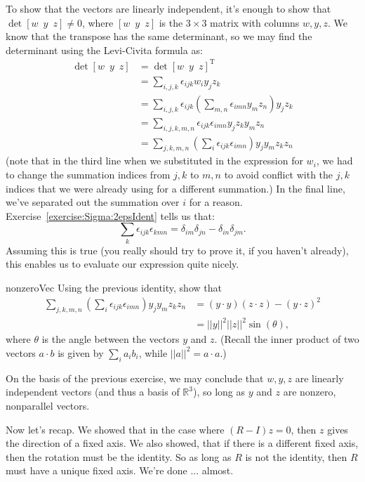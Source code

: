 \begin{itemize}
To show that the vectors are linearly independent, it's enough to show that $\det [w \,\,\, y\,\,\, z] \neq 0$, where $[w \,\,\, y\,\,\, z]$ is the $3 \times 3$ matrix with columns $w, y,z$. We know that the transpose has the same determinant, so we may find the determinant using the Levi-Civita formula as:
\begin{align*}
\det [w \,\,\, y\,\,\, z] &= \det [w \,\,\, y\,\,\, z]^{\text{T}}\\
&= \sum_{i,j,k} \epsilon_{ijk} w_i y_j z_k \\
&= \sum_{i,j,k} \epsilon_{ijk} \left( \sum_{m,n}\epsilon_{imn}y_mz_n \right) y_j z_k \\
&= \sum_{i,j,k,m,n} \epsilon_{ijk} \epsilon_{imn}  y_j z_ky_mz_n \\
&=  \sum_{j,k,m,n} \left( \sum_{i} \epsilon_{ijk} \epsilon_{imn}\right)  y_j y_m z_k z_n
\end{align*}
(note that in the third line when we substituted in the expression for $w_i$, we had to change the summation indices from $j,k$ to $m,n$ to avoid conflict with the $j,k$ indices that we were already using for a different summation.) In the final line, we've separated out the summation over $i$ for a reason.  Exercise~\ref{exercise:Sigma:2epsIdent} tells us that:
\[\sum_k \epsilon_{ijk} \epsilon_{kmn} = \delta_{im} \delta_{jn} - \delta_{in} \delta_{jm}. \]
Assuming this is true (you really should try to prove it, if you haven't already), this enables us to evaluate our expression quite nicely.

\begin{exercise}{nonzeroVec}
Using the previous identity, show that 
\begin{align*}
 \sum_{j,k,m,n} \left( \sum_{i} \epsilon_{ijk} \epsilon_{imn}\right)  y_j y_m z_k z_n &= (y \cdot y)(z \cdot z)-(y \cdot z)^2 \\
&= ||y||^2 ||z||^2 \sin(\theta),
\end{align*}
where $\theta$ is the angle between the vectors $y$ and $z$.
(Recall the inner product of two vectors $a \cdot b$ is given by $\sum_i a_i b_i$, while $||a||^2 = a \cdot a$.)
\end{exercise}
On the basis of the previous exercise, we may conclude that $w,y,z$ are linearly independent vectors (and thus a basis of $\mathbb{R}^3$), so long as $y$ and $z$ are nonzero, nonparallel vectors. 

Now let's recap.  We showed that in the case where $(R-I)z = 0$, then $z$ gives the direction of a fixed axis. We also showed, that if there is a different fixed axis, then the rotation must be the identity.  So as long as $R$ is not the identity, then $R$ must have a unique fixed axis. We're done ... almost.
\end{itemize}

